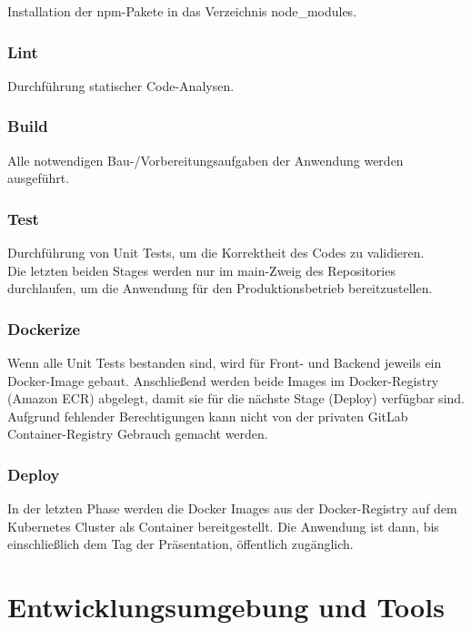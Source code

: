\documentclass[letterpaper, 10 pt, conference]{ieeeconf}
\begin{document}
Installation der npm-Pakete in das Verzeichnis node\_modules.

\subsubsection{Lint}

Durchführung statischer Code-Analysen.

\subsubsection{Build}

Alle notwendigen Bau-/Vorbereitungsaufgaben der Anwendung werden ausgeführt.

\subsubsection{Test}

Durchführung von Unit Tests, um die Korrektheit des Codes zu validieren.  \\

Die letzten beiden Stages werden nur im main-Zweig des Repositories durchlaufen, um die Anwendung für den Produktionsbetrieb bereitzustellen.

\subsubsection{Dockerize}

Wenn alle Unit Tests bestanden sind, wird für Front- und Backend jeweils ein Docker-Image gebaut. Anschließend werden beide Images im Docker-Registry (Amazon ECR) abgelegt, damit sie für die nächste Stage (Deploy) verfügbar sind.  Aufgrund fehlender Berechtigungen kann nicht von der privaten GitLab Container-Registry Gebrauch gemacht werden.

\subsubsection{Deploy}

In der letzten Phase werden die Docker Images aus der Docker-Registry auf dem Kubernetes Cluster als Container bereitgestellt. Die Anwendung ist dann,  bis einschließlich dem Tag der Präsentation, öffentlich zugänglich.


\section{Entwicklungsumgebung und Tools}
\end{document}
